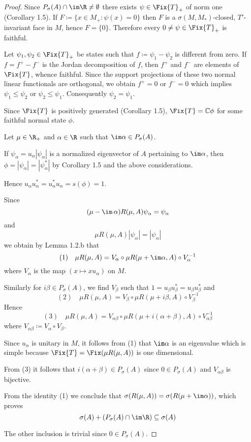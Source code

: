 \begin{proof}
Since $P_{\sigma}(A) \cap \im\R \neq \emptyset$ there exists $\psi \in \Fix{T}_{+}$ of norm one (Corollary 1.5).
If $F \coloneqq \{x \in M_{+} \colon \psi(x) = 0\}$ then $F$ is a $\sigma(M,M_{*})$-closed, $T'$-invariant face in $M$, hence $F = \{0\}$.
Therefore every $0 \neq \psi \in \Fix{T}_{+}$ is faithful.

Let $\psi_{1}, \psi_{2} \in \Fix{T}_{+}$ be states such that $f \coloneqq \psi_{1} - \psi_{2}$ is different from zero. 
If $f = f^{+} - f^{-}$ is the Jordan decomposition of $f$, then $f^{+}$ and $f^{-}$ are elements of $\Fix{T}$, whence faithful.
Since the support projections of these two normal linear functionals are orthogonal, we obtain $f^{+} = 0$ or $f^{-} = 0$ which implies $\psi_{1} \leq \psi_{2}$ or $\psi_{2} \leq \psi_{1}$.
Consequently $\psi_{2} = \psi_{1}$.

Since $\Fix{T}$ is positively generated (Corollary 1.5), $\Fix{T} = \mathbb{C}\phi$ for some faithful normal state $\phi$.

Let $\mu \in \R_{+}$ and $\alpha \in \R$ such that $\im\alpha \in P_{\sigma}(A)$.

If $\psi_{\alpha} = u_{\alpha}|\psi_{\alpha}|$ is a normalized eigenvector of $A$ pertaining to $\im\alpha$, then $\phi = |\psi_{\alpha}| = |\psi_{\alpha}^{*}|$ by Corollary 1.5 and the above considerations.

Hence $u_{\alpha}u_{\alpha}^{*} = u_{\alpha}^{*}u_{\alpha} = s(\phi) = 1$.

Since
\[
(\mu - \im\,\alpha)R(\mu,A)\psi_{\alpha} = \psi_{\alpha}
\]
and
\[
\mu R(\mu,A)|\psi_{\alpha}| = |\psi_{\alpha}|
\]
we obtain by Lemma 1.2.b that
\[
(1) \quad \mu R(\mu,A) = V_{\alpha} \circ \mu R(\mu+\im\alpha,A) \circ V_{\alpha}^{-1}
\]
where $V_{\alpha}$ is the map $(x \mapsto xu_{\alpha})$ on $M$.

Similarly for $i\beta \in P_{\sigma}(A)$, we find $V_{\beta}$ such that $1 = u_{\beta}u_{\beta}^{*} = u_{\beta}u_{\beta}^{*}$ and
\[
(2) \quad \mu R(\mu,A) = V_{\beta} \circ \mu R(\mu+i\beta,A) \circ V_{\beta}^{-1}
\]
Hence
\[
(3) \quad \mu R(\mu,A) = V_{\alpha\beta} \circ \mu R(\mu+i(\alpha+\beta),A) \circ V_{\alpha\beta}^{-1}
\]
where $V_{\alpha\beta} \coloneqq V_{\alpha} \circ V_{\beta}$.

Since $u_{\alpha}$ is unitary in $M$, it follows from (1) that $\im\alpha$ is an eigenvalue which is simple because $\Fix{T} = \Fix(\mu R(\mu,A))$ is one dimensional.

From (3) it follows that $i(\alpha+\beta) \in P_{\sigma}(A)$ since $0 \in P_{\sigma}(A)$ and $V_{\alpha\beta}$ is bijective.

From the identity (1) we conclude that $\sigma(R(\mu,A)) = \sigma(R(\mu+\im\alpha))$, which proves
\[
\sigma(A) + (P_{\sigma}(A) \cap \im\R) \subseteq \sigma(A)
\]

The other inclusion is trivial since $0 \in P_{\sigma}(A)$.
\end{proof}


